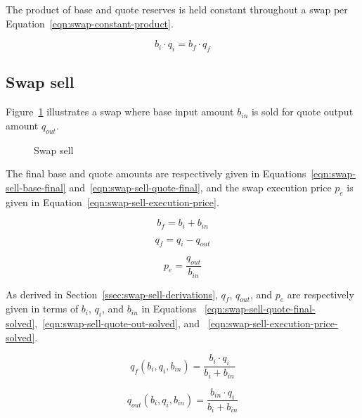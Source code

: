 \documentclass[table, twocolumn]{article}
\begin{document}
The product of base and quote reserves is held constant throughout a swap per
Equation~\ref{eqn:swap-constant-product}.

\begin{equation}\label{eqn:swap-constant-product}
	b_i \cdot q_i = b_f \cdot q_f
\end{equation}

\subsection{Swap sell}\label{ssec:swap-sell}

Figure~\ref{fig:swap-sell} illustrates a swap where base input amount $b_{in}$ is sold
for quote output amount $q_{out}$.

\begin{figure}[!htb]
	\centering
	
	\caption{Swap sell}\label{fig:swap-sell}
\end{figure}

The final base and quote amounts are respectively given in
Equations~\ref{eqn:swap-sell-base-final} and~\ref{eqn:swap-sell-quote-final}, and the
swap execution price $p_e$ is given in Equation~\ref{eqn:swap-sell-execution-price}.

\begin{equation}\label{eqn:swap-sell-base-final}
	b_f = b_i + b_{in}
\end{equation}

\begin{equation}\label{eqn:swap-sell-quote-final}
	q_f = q_i - q_{out}
\end{equation}

\begin{equation}\label{eqn:swap-sell-execution-price}
	p_e = \frac{q_{out}}{b_{in}}
\end{equation}

As derived in Section~\ref{ssec:swap-sell-derivations}, $q_f$, $q_{out}$, and $p_e$ are
respectively given in terms of $b_i$, $q_i$, and $b_{in}$ in Equations%
~\ref{eqn:swap-sell-quote-final-solved},~\ref{eqn:swap-sell-quote-out-solved}, and%
~\ref{eqn:swap-sell-execution-price-solved}.

\begin{equation}\label{eqn:swap-sell-quote-final-solved}
	q_f(b_i, q_i, b_{in}) = \frac{b_i \cdot q_i}{b_i + b_{in}}
\end{equation}

\begin{equation}\label{eqn:swap-sell-quote-out-solved}
	q_{out} (b_i, q_i, b_{in}) = \frac{b_{in} \cdot q_i}{b_i + b_{in}}
\end{equation}
\end{document}
